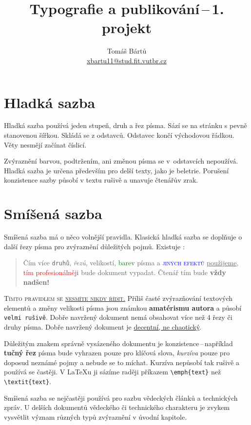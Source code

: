\documentclass[a4paper,twocolumn]{article}[20-02-2022]
\title{Typografie a publikování\,--\,1. projekt}
\author{Tomáš Bártů \\ \href{mailto:xbartu11@stud.fit.vutbr.cz}{xbartu11@stud.fit.vutbr.cz}}
\date{}
\newcommand{\red}[1]{\textcolor{red}{#1}}
\newcommand{\green}[1]{\textcolor{green}{#1}}
\newcommand{\blue}[1]{\textcolor{blue}{#1}}
\begin{document}
\maketitle

\section{Hladká sazba}
Hladká sazba používá jeden stupeň, druh a řez písma.
Sází se na stránku s pevně stanovenou šířkou.
Skládá se z odstavců. Odstavec končí východovou řádkou.
Věty nesmějí začínat číslicí.

Zvýraznění barvou, podtržením, ani změnou písma se v~odstavcích nepoužívá.
Hladká sazba je určena především pro delší texty, jako je beletrie.
Porušení konzistence sazby působí v textu rušivě a unavuje čtenářův zrak.


\section{Smíšená sazba}
\label{vazba}
Smíšená sazba má o něco volnější pravidla.
Klasická hladká sazba se doplňuje o další řezy písma pro zvýraznění důležitých pojmů.
Existuje :

\begin{quotation}
Čím více \texttt{druhů}, \emph{řezů}, {\tiny velikostí}, \green{barev} písma a \textsc{\blue{jiných efektů}} \underline{použijeme}, \red{tím profesionálněji} bude {\selectfont dokument} vypadat.
Čtenář tím bude \textbf{\Huge vždy nadšen!}
\end{quotation}

\textsc{Tímto pravidlem se \underline{nesmíte nikdy řídit.}}
Příliš časté zvýrazňování textových elementů a změny {\scriptsize velikosti} písma jsou známkou \textbf{amatérismu autora} a působí \texttt{velmi rušivě}.
Dobře navržený dokument nemá obsahovat více než 4 řezy či druhy písma.
Dobře navržený dokument je \underline{decentní, ne chaotický}.

Důležitým znakem správně vysázeného dokumentu je konzistence\,--\,například \textbf{tučný řez} písma bude vyhrazen pouze pro klíčová slova, \emph{kurzíva} pouze pro doposud neznámé pojmy a nebude se to míchat.
Kurzíva nepůsobí tak rušivě a používá se častěji.
V \LaTeX u ji sázíme raději příkazem  \verb|\emph{text}| než \verb|\textit{text}|.

Smíšená sazba se nejčastěji používá pro sazbu vědeckých článků a technických zpráv.
U delších dokumentů vědeckého či technického charakteru je zvykem vysvětlit význam různých typů zvýraznění v úvodní kapitole.
\end{document}
